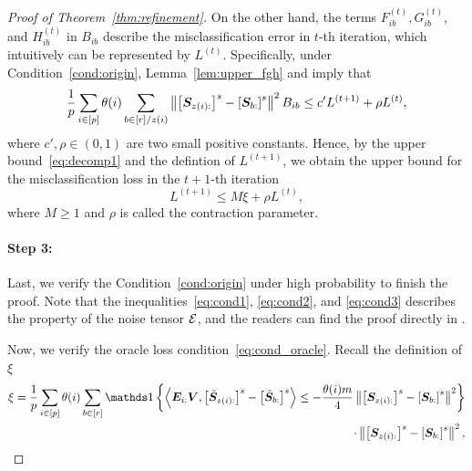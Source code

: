 \documentclass[lettersize,onecolumn,journal]{IEEEtran}
\theoremstyle{definition}
\theoremstyle{definition}
\newcommand{\off}[1]{\left[#1\right]}
\newcommand{\offf}[1]{\left\{#1\right\}}
\newcommand{\ang}[1]{\left\langle#1\right\rangle}
\def\fixme#1#2{\textbf{\color{red}[FIXME (#1): #2]}}
\begin{document}
\begin{proof}[Proof of Theorem~\ref{thm:refinement}]
    On the other hand, the terms $ F_{ib}^{(t)}, G_{ib}^{(t)}$, and $H_{ib}^{(t)}$ in $B_{ib}$ describe the misclassification error in $t$-th iteration, which intuitively can be represented by $L^{(t)}$. Specifically, under Condition~\ref{cond:origin}, Lemma~\ref{lem:upper_fgh} and \citet[Step 4, Proof of Theorem 2]{han2020exact} imply that 
    \begin{equation}
        \frac{1}{p} \sum_{i \in [p] } \theta(i) \sum_{b \in [r]/z(i)}  \onorm{ \off{ \mS_{ z(i):}  }^s - \off{ \mS_{b:}  }^s  }^2 B_{ib} \leq c' L^{(t+1)} + \rho L^{(t)},
    \end{equation}
    where $c', \rho \in (0,1)$ are two small positive constants. Hence, by the upper bound~\eqref{eq:decomp1} and the defintion of $L^{(t+1)}$, we obtain the upper bound for the misclassification loss in the $t+1$-th iteration
    \begin{equation}\label{eq:decomp_t}
        L^{(t+1)} \leq M \xi + \rho L^{(t)},
    \end{equation}
    where $M \geq 1$ and $\rho$ is called the contraction parameter.  
    
    \paragraph{Step 3:} Last, we verify the Condition~\ref{cond:origin} under high probability to finish the proof. Note that the inequalities~\eqref{eq:cond1}, \eqref{eq:cond2}, and \eqref{eq:cond3} describes the property of the noise tensor $\mathcal{E}$, and the readers can find the proof directly in \citet[Step 5, Proof of Theorem 2]{han2020exact}.  
    
    Now, we verify the oracle loss condition~\eqref{eq:cond_oracle}. Recall the definition of $\xi$
    \begin{align}
        \xi = \frac{1}{p} \sum_{i \in [p]} \theta(i) \sum_{b \in [r]} \ind \offf{  \ang{ \mE_{i:} \mV, \off{  \tilde \mS_{z(i):} }^s - \off{  \tilde \mS_{b:} }^s }  \leq - \frac{\theta(i) m}{4} \onorm{ \off{ \mS_{z(i):}  }^s - \off{ \mS_{b:}  }^s  }^2 }\\
        \cdot \onorm{ \off{ \mS_{z(i):}  }^s - \off{ \mS_{ b:}  }^s  }^2,
    \end{align}


\end{proof}
\end{document}
